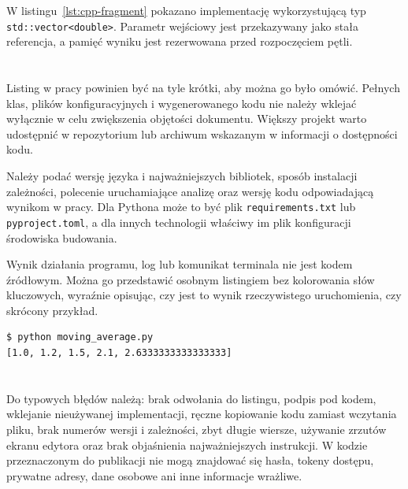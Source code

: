 W listingu~\ref{lst:cpp-fragment} pokazano implementację wykorzystującą typ
\texttt{std::vector<double>}. Parametr wejściowy jest przekazywany jako stała referencja,
a pamięć wyniku jest rezerwowana przed rozpoczęciem pętli.



\section{}

Listing w pracy powinien być na tyle krótki, aby można go było omówić. Pełnych klas,
plików konfiguracyjnych i wygenerowanego kodu nie należy wklejać wyłącznie w celu
zwiększenia objętości dokumentu. Większy projekt warto udostępnić w repozytorium lub
archiwum wskazanym w informacji o dostępności kodu.

Należy podać wersję języka i najważniejszych bibliotek, sposób instalacji zależności,
polecenie uruchamiające analizę oraz wersję kodu odpowiadającą wynikom w pracy. Dla
Pythona może to być plik \texttt{requirements.txt} lub \texttt{pyproject.toml}, a dla
innych technologii właściwy im plik konfiguracji środowiska budowania.

Wynik działania programu, log lub komunikat terminala nie jest kodem źródłowym. Można
go przedstawić osobnym listingiem bez kolorowania słów kluczowych, wyraźnie opisując,
czy jest to wynik rzeczywistego uruchomienia, czy skrócony przykład.

\begin{lstlisting}[style=thesis,caption={Przykładowy wynik uruchomienia programu},label={lst:wynik-programu},numbers=none,xleftmargin=0.25cm,framexleftmargin=0cm]
$ python moving_average.py
[1.0, 1.2, 1.5, 2.1, 2.6333333333333333]
\end{lstlisting}

\section{}

Do typowych błędów należą: brak odwołania do listingu, podpis pod kodem, wklejanie
nieużywanej implementacji, ręczne kopiowanie kodu zamiast wczytania pliku, brak numerów
wersji i zależności, zbyt długie wiersze, używanie zrzutów ekranu edytora oraz brak
objaśnienia najważniejszych instrukcji. W kodzie przeznaczonym do publikacji nie mogą
znajdować się hasła, tokeny dostępu, prywatne adresy, dane osobowe ani inne informacje
wrażliwe.
